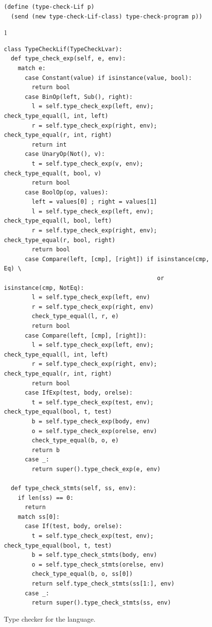 \documentclass[7x10]{TimesAPriori_MIT}%
\def\pythonEd{1}
\def\edition{0}
\numberwithin{theorem}{chapter}
\numberwithin{definition}{chapter}
\numberwithin{equation}{chapter}
\begin{document}
\begin{figure}[tbp]
\begin{tcolorbox}[colback=white]
{\begin{lstlisting}[basicstyle=\ttfamily\footnotesize]
(define (type-check-Lif p)
  (send (new type-check-Lif-class) type-check-program p))
\end{lstlisting}
\fi}
{\if\edition\pythonEd
\begin{lstlisting}
class TypeCheckLif(TypeCheckLvar):
  def type_check_exp(self, e, env):
    match e:
      case Constant(value) if isinstance(value, bool):
        return bool
      case BinOp(left, Sub(), right):
        l = self.type_check_exp(left, env); check_type_equal(l, int, left)
        r = self.type_check_exp(right, env); check_type_equal(r, int, right)
        return int
      case UnaryOp(Not(), v):
        t = self.type_check_exp(v, env); check_type_equal(t, bool, v)
        return bool 
      case BoolOp(op, values):
        left = values[0] ; right = values[1]
        l = self.type_check_exp(left, env); check_type_equal(l, bool, left)
        r = self.type_check_exp(right, env); check_type_equal(r, bool, right)
        return bool
      case Compare(left, [cmp], [right]) if isinstance(cmp, Eq) \
                                            or isinstance(cmp, NotEq):
        l = self.type_check_exp(left, env)
        r = self.type_check_exp(right, env)
        check_type_equal(l, r, e)
        return bool
      case Compare(left, [cmp], [right]):
        l = self.type_check_exp(left, env); check_type_equal(l, int, left)
        r = self.type_check_exp(right, env); check_type_equal(r, int, right)
        return bool
      case IfExp(test, body, orelse):
        t = self.type_check_exp(test, env); check_type_equal(bool, t, test)
        b = self.type_check_exp(body, env)
        o = self.type_check_exp(orelse, env)
        check_type_equal(b, o, e)
        return b
      case _:
        return super().type_check_exp(e, env)

  def type_check_stmts(self, ss, env):
    if len(ss) == 0:
      return
    match ss[0]:
      case If(test, body, orelse):
        t = self.type_check_exp(test, env); check_type_equal(bool, t, test)
        b = self.type_check_stmts(body, env)
        o = self.type_check_stmts(orelse, env)
        check_type_equal(b, o, ss[0])
        return self.type_check_stmts(ss[1:], env)
      case _:
        return super().type_check_stmts(ss, env)
\end{lstlisting}
\fi}
\end{tcolorbox}
\caption{Type checker for the \LangIf{} language.}
\label{fig:type-check-Lif}
\end{figure}
\end{document}
